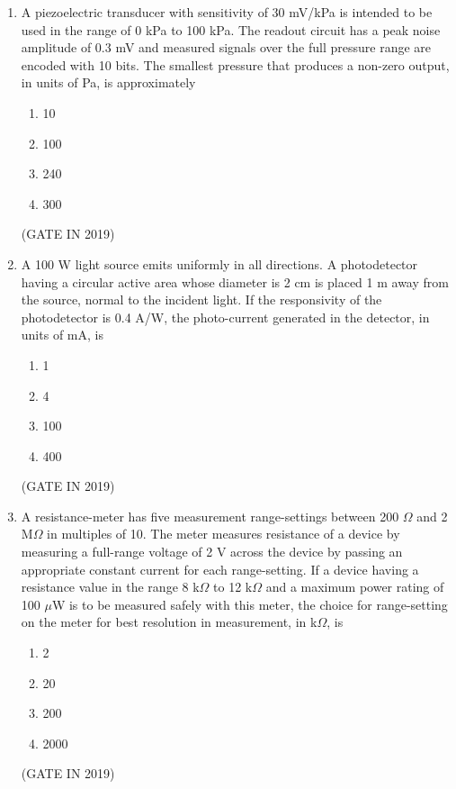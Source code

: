 \documentclass[journal]{IEEEtran}
\begin{document}
\begin{enumerate}
\item A piezoelectric transducer with sensitivity of 30 mV/kPa is intended to be used in the range of 0 kPa to 100 kPa. The readout circuit has a peak noise amplitude of 0.3 mV and measured signals over the full pressure range are encoded with 10 bits. The smallest pressure that produces a non-zero output, in units of Pa, is approximately
\begin{multicols}{4}
\begin{enumerate}
\item 10
\item 100
\item 240
\item 300
\end{enumerate}
\end{multicols} \hfill(GATE IN 2019)

\item A 100 W light source emits uniformly in all directions. A photodetector having a circular active area whose diameter is 2 cm is placed 1 m away from the source, normal to the incident light. If the responsivity of the photodetector is 0.4 A/W, the photo-current generated in the detector, in units of mA, is
\begin{multicols}{4}
\begin{enumerate}
\item 1
\item 4
\item 100
\item 400
\end{enumerate}
\end{multicols} \hfill(GATE IN 2019)

\item A resistance-meter has five measurement range-settings between 200 $\Omega$ and 2 M$\Omega$ in multiples of 10. The meter measures resistance of a device by measuring a full-range voltage of 2 V across the device by passing an appropriate constant current for each range-setting. If a device having a resistance value in the range 8 k$\Omega$ to 12 k$\Omega$ and a maximum power rating of 100 $\mu$W is to be measured safely with this meter, the choice for range-setting on the meter for best resolution in measurement, in k$\Omega$, is
\begin{multicols}{4}
\begin{enumerate}
\item 2
\item 20
\item 200
\item 2000
\end{enumerate}
\end{multicols} \hfill(GATE IN 2019)


\end{enumerate}
\end{document}
